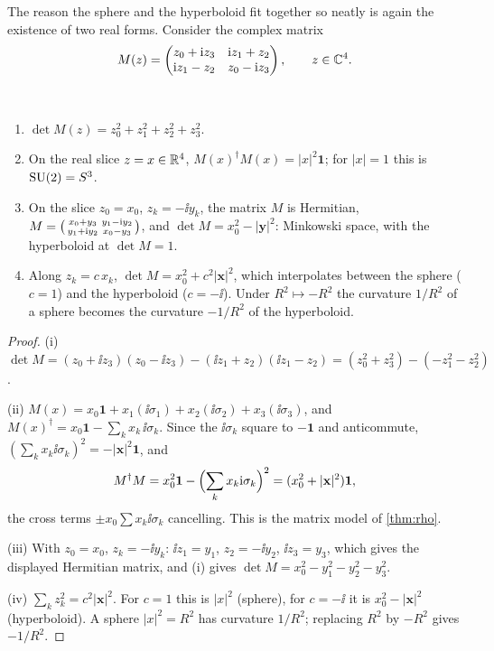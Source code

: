 The reason the sphere and the hyperboloid fit together so neatly is again the existence of two real forms. Consider the complex matrix
\[
M(z)=\begin{pmatrix} z_0+\mathrm{i} z_3 & \mathrm{i} z_1+z_2\\ \mathrm{i} z_1-z_2 & z_0-\mathrm{i} z_3\end{pmatrix},\qquad z\in\mathbb{C}^4 .
\]

\begin{theorem}\label{thm:twoslices}\ver\
\begin{enumerate}[label=(\roman*)]
\item $\det M(z)=z_0^2+z_1^2+z_2^2+z_3^2$.
\item On the real slice $z=x\in\mathbb{R}^4$, $M(x)^\dagger M(x)=|x|^2\mathbf 1$; for $|x|=1$ this is $\mathrm{SU}(2)=S^3$.
\item On the slice $z_0=x_0$, $z_k=-\ii y_k$, the matrix $M$ is Hermitian, $M=\begin{psmallmatrix}x_0+y_3&y_1-\mathrm{i} y_2\\ y_1+\mathrm{i} y_2&x_0-y_3\end{psmallmatrix}$, and $\det M=x_0^2-|\mathbf y|^2$: Minkowski space, with the hyperboloid at $\det M=1$.
\item Along $z_k=c\,x_k$, $\det M=x_0^2+c^2|\mathbf x|^2$, which interpolates between the sphere ($c=1$) and the hyperboloid ($c=-\ii$). Under $R^2\mapsto-R^2$ the curvature $1/R^2$ of a sphere becomes the curvature $-1/R^2$ of the hyperboloid.
\end{enumerate}
\end{theorem}
\begin{proof}
(i) $\det M=(z_0+\ii z_3)(z_0-\ii z_3)-(\ii z_1+z_2)(\ii z_1-z_2)=(z_0^2+z_3^2)-(-z_1^2-z_2^2)$.

(ii) $M(x)=x_0\mathbf 1+x_1(\ii\sigma_1)+x_2(\ii\sigma_2)+x_3(\ii\sigma_3)$, and $M(x)^\dagger=x_0\mathbf 1-\sum_kx_k\,\ii\sigma_k$. Since the $\ii\sigma_k$ square to $-\mathbf 1$ and anticommute, $(\sum_kx_k\ii\sigma_k)^2=-|\mathbf x|^2\mathbf 1$, and
\[
M^\dagger M=x_0^2\mathbf 1-\Bigl(\sum_kx_k\mathrm{i}\sigma_k\Bigr)^2=(x_0^2+|\mathbf x|^2)\mathbf 1,
\]
the cross terms $\pm x_0\sum x_k\ii\sigma_k$ cancelling. This is the matrix model of \cref{thm:rho}.

(iii) With $z_0=x_0$, $z_k=-\ii y_k$: $\ii z_1=y_1$, $z_2=-\ii y_2$, $\ii z_3=y_3$, which gives the displayed Hermitian matrix, and (i) gives $\det M=x_0^2-y_1^2-y_2^2-y_3^2$.

(iv) $\sum_kz_k^2=c^2|\mathbf x|^2$. For $c=1$ this is $|x|^2$ (sphere), for $c=-\ii$ it is $x_0^2-|\mathbf x|^2$ (hyperboloid). A sphere $|x|^2=R^2$ has curvature $1/R^2$; replacing $R^2$ by $-R^2$ gives $-1/R^2$.
\end{proof}



